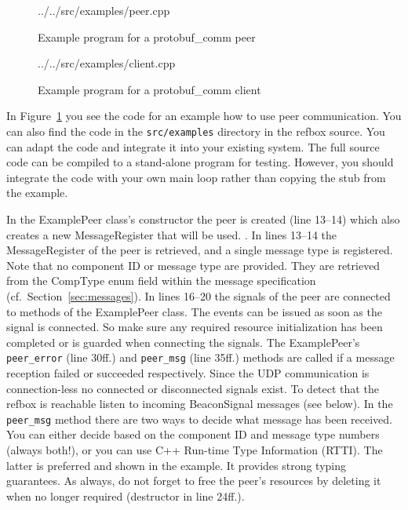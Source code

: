 \documentclass[a4paper]{article}
\newcommand{\refsec}[1]{Section~\ref{#1}}
\newcommand{\reffig}[1]{Figure~\ref{#1}}
\begin{document}
\begin{figure}
  
    {../../src/examples/peer.cpp}
\vspace{-3mm}
\caption{Example program for a protobuf\_comm peer}
\label{fig:example-peer}
\end{figure}
\begin{figure}
  
    {../../src/examples/client.cpp}
\caption{Example program for a protobuf\_comm client}
\label{fig:example-client}
\end{figure}
In \reffig{fig:example-peer} you see the code for an example how to
use peer communication. You can also find the code in the
\texttt{src/examples} directory in the refbox source. You can adapt
the code and integrate it into your existing system. The full source
code can be compiled to a stand-alone program for testing. However,
you should integrate the code with your own main loop rather than
copying the stub from the example.

In the ExamplePeer class's constructor the peer is created (line
13--14) which also creates a new MessageRegister that will be used.
. In lines 13--14 the MessageRegister of the peer is retrieved, and
a single message type is registered. Note that no component ID or
message type are provided. They are retrieved from the CompType enum
field within the message specification (cf.~\refsec{sec:messages}). In
lines 16--20 the signals of the peer are connected to methods of the
ExamplePeer class. The events can be issued as soon as the signal is
connected. So make sure any required resource initialization has been
completed or is guarded when connecting the signals. The ExamplePeer's
\texttt{peer\_error} (line 30ff.) and \texttt{peer\_msg} (line 35ff.)
methods are called if a message reception failed or succeeded
respectively. Since the UDP communication is connection-less no
connected or disconnected signals exist. To detect that the refbox is
reachable listen to incoming BeaconSignal messages (see below). In the
\texttt{peer\_msg} method there are two ways to decide what message
has been received. You can either decide based on the component ID and
message type numbers (always both!), or you can use C++ Run-time Type
Information (RTTI). The latter is preferred and shown in the
example. It provides strong typing guarantees. As always, do not
forget to free the peer's resources by deleting it when no longer
required (destructor in line 24ff.).
\end{document}
